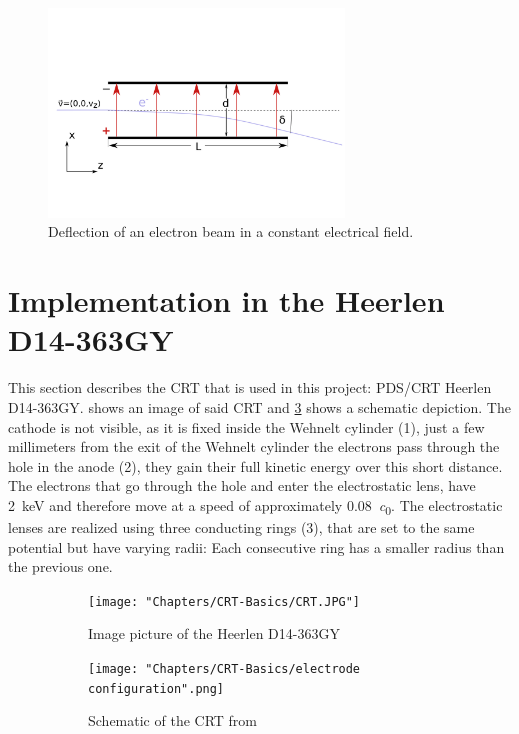 \begin{figure}
	\centering
	\includegraphics[width=0.7\textwidth]{Chapters/CRT-Basics/DeflectionPlate2}
	\caption{Deflection of an electron beam in a constant electrical field.}
	\label{fig:deflectionplate2}
\end{figure}

\section{Implementation in the Heerlen D14-363GY }


This section describes the CRT that is used in this project: PDS/CRT Heerlen D14-363GY.  shows an image of said CRT and \cref{fig:SchemeCRT} shows a schematic depiction. The cathode is not visible, as it is fixed inside the Wehnelt cylinder (1), just a few millimeters from the exit of the Wehnelt cylinder the electrons pass through the hole in the anode (2), they gain their full kinetic energy over this short distance. The electrons that go through the hole and enter the electrostatic lens, have \SI{2}{\kilo\electronvolt} and therefore move at a speed of approximately \SI{0.08}{\clight}. 
The electrostatic lenses are realized using three conducting rings (3), that are set to the same potential but have varying radii: Each consecutive ring has a smaller radius than the previous one. 

\begin{figure}
	\centering
	\begin{subfigure}{.5\textwidth}
		\centering
		\texttt{[image: "Chapters/CRT-Basics/CRT.JPG"]}
		\caption{Image picture of the Heerlen D14-363GY}
		\label{fig:FotoCRT}
	\end{subfigure}%
	\begin{subfigure}{.5\textwidth}
		\centering
		\texttt{[image: "Chapters/CRT-Basics/electrode configuration".png]}
		\caption{Schematic of the CRT from \cite{D14363GY123-manual}}
		\label{fig:SchemeCRT}
	\end{subfigure}
	\caption{}
	\label{}
\end{figure}


